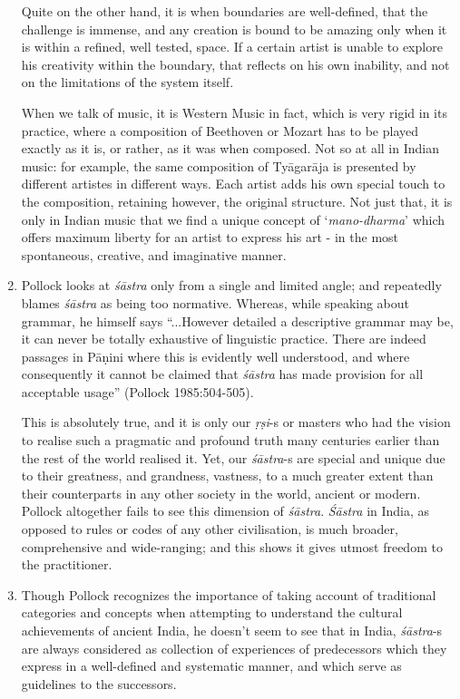 \begin{enumerate}
Quite on the other hand, it is when boundaries are well-defined, that the challenge is immense, and any creation is bound to be amazing only when it is within a refined, well tested, space. If a certain artist is unable to explore his creativity within the boundary, that reflects on his own inability, and not on the limitations of the system itself. 

When we talk of music, it is Western Music in fact, which is very rigid in its practice, where a composition of Beethoven or Mozart has to be played exactly as it is, or rather, as it was when composed. Not so at all in Indian music: for example, the same composition of Tyāgarāja is presented by different artistes in different ways. Each artist adds his own special touch to the composition, retaining however, the original structure. Not just that, it is only in Indian music that we find a unique concept of `{\it mano-dharma}' which offers maximum liberty for an artist to express his art - in the most spontaneous, creative, and imaginative manner. 

\item Pollock looks at {\it śāstra} only from a single and limited angle; and repeatedly blames {\it śāstra} as being too normative. Whereas, while speaking about grammar, he himself says ``...However detailed a descriptive grammar may be, it can never be totally exhaustive of linguistic practice. There are indeed passages in Pāṇini where this is evidently well understood, and where consequently it cannot be claimed that {\it śāstra} has made provision for all acceptable usage'' (Pollock 1985:504-505). 

This is absolutely true, and it is only our {\it ṛṣi}-s or masters who had the vision to realise such a pragmatic and profound truth many centuries earlier than the rest of the world realised it.  Yet, our {\it śāstra}-s are special and unique due to their greatness, and grandness, vastness, to a much greater extent than their counterparts in any other society in the world, ancient or modern. Pollock altogether fails to see this dimension of {\it śāstra}. {\it Śāstra} in India, as opposed to rules or codes of any other civilisation, is much broader, comprehensive and wide-ranging; and this shows it gives utmost freedom to the practitioner.

\item Though Pollock recognizes the importance of taking account of traditional categories and concepts when attempting to understand the cultural achievements of ancient India, he doesn't seem to see that in India, {\it śāstra}-s are always considered as collection of experiences of predecessors which they express in a well-defined and systematic manner, and which serve as guidelines to the successors. 


\end{enumerate}
